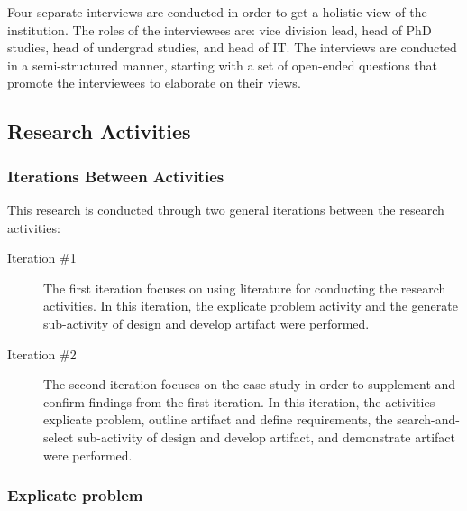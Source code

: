 Four separate interviews are conducted in order to get a holistic view of the institution. The roles of the interviewees are: vice division lead, head of PhD studies, head of undergrad studies, and head of IT. The interviews are conducted in a semi-structured manner, starting with a set of open-ended questions that promote the interviewees to elaborate on their views. 


\subsection{Research Activities}

\subsubsection*{Iterations Between Activities}

This research is conducted through two general iterations between the research activities:
\begin{description}
  \item[Iteration \#1] The first iteration focuses on using literature for conducting the research activities. In this iteration, the explicate problem activity and the generate sub-activity of design and develop artifact were performed. %
  \item[Iteration \#2] The second iteration focuses on the case study in order to supplement and confirm findings from the first iteration. In this iteration, the activities explicate problem, outline artifact and define requirements, the search-and-select sub-activity of design and develop artifact, and demonstrate artifact were performed.%
\end{description}

\subsubsection*{Explicate problem}

